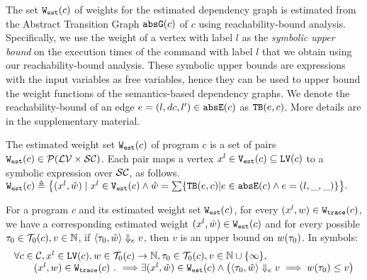 The set $\mathtt{{W_{est}}}(c)$ of weights for the estimated dependency graph is estimated from 
the Abstract Transition Graph $\mathtt{abs}{\mathtt{G}}(c)$ of $c$ using reachability-bound analysis.
 Specifically, we use the weight of a vertex with label $l$ as the \emph{symbolic upper bound} on the 
 execution times of the command with label $l$ that we obtain using our reachability-bound analysis. 
 These symbolic upper bounds are expressions with the input variables as free variables, 
 hence they can be used to upper bound the weight functions of the semantics-based dependency graphs.
We denote the reachability-bound of an edge $e = (l, dc, l') \in \mathtt{abs}{\mathtt{E}}(c)$ as ${\mathtt{TB}}(e, c)$.
More details are in the supplementary material.%
   
\begin{defn}
  \vspace{-0.1cm}
 \label{def:adaptfun-weight}
The estimated weight set $\mathtt{{W_{est}}}(c)$ of program $c$ is a set of pairs $\mathtt{{W_{est}}}(c) \in \mathcal{P}(\mathcal{LV} \times \mathcal{SC})$.
Each pair maps
a vertex $x^l \in\mathtt{{V_{est}}}(c)\subseteq  \mathtt{LV}(c)$ to a symbolic expression over $\mathcal{SC}$,
as follows.
 $
 \progW(c) \triangleq
 \left\{ (x^l, \hat{w}) 
\mid
x^l \in \progV(c) 
\land 
\hat{w} = 
\sum\left\{ \absclr(e, c) \middle\vert e \in \absE(c) \land e = (l, \_, \_) \right\}
\right\}.
$
\end{defn}
%
\begin{thm}
 \label{thm:addweight_soundness}
 \vspace{-0.1cm}
For a program ${c}$ and its estimated weight set $\mathtt{{W_{est}}}(c)$, for every  $(x^l, w) \in \mathtt{{W_{trace}}}(c) $,
we have a corresponding estimated weight $(x^l, \hat{w}) \in \mathtt{{W_{est}}}(c)$ and for every possible 
$\mathtt{\tau}_0 \in \mathcal{T}_0(c),
v \in \mathbb{N}$,
if $\langle \mathtt{\tau}_0, \hat{w} \rangle \Downarrow_e v$,
then $v$ is an upper bound on ${w}(\mathtt{\tau}_0)$. In symbols:
\[
 \begin{array}{l}
 \forall c \in \mathcal{C}, x^l \in \mathtt{LV}(c),w\in \mathcal{T}_0(c)\to \mathbb{N},\mathtt{\tau}_0 \in \mathcal{T}_0(c), 
v \in \mathbb{N}\cup \{\infty\}, 
\\ \qquad
(x^l, w) \in \mathtt{{W_{trace}}}(c) ~.~ \Longrightarrow
\exists
(x^l, \hat{w}) \in \mathtt{{W_{est}}}(c) 
\land
\big(
 \langle \mathtt{\tau}_0, \hat{w} \rangle \Downarrow_e v \implies w(\mathtt{\tau}_0) \leq v
\big)
\end{array}
\]
\end{thm}
